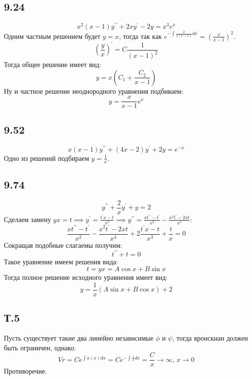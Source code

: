 \documentclass[12pt]{article}
\begin{document}
\subsection*{9.24}
\[
    x^2 (x - 1) y^{\prime\prime} + 2x y^{\prime} - 2y = x^3 e^x 
\]
Одним частным решением будет $y = x$, 
тогда так как $e^{-\int \frac{2}{x(x - 1)} dx } = (\frac{x}{x - 1})^2$. 
\[
    \left( \frac{y}{x} \right)^{\prime} = C \frac{1}{(x - 1)^2}
\] 
Тогда общее решение имеет вид: 
\[
    y = x (C_1 + \frac{C_2}{x - 1})
\]
Ну и частное решение неоднородного уравнения подбиваем: 
\[
    y = \frac{x}{x - 1} e^x
\]

\subsection*{9.52}
\[
    x(x - 1) y^{\prime\prime} + (4x - 2)y^{\prime} + 2y = e^{-x} 
\]
Одно из решений подбираем $y = \frac{1}{x}$. 


\subsection*{9.74}
\[
    y^{\prime\prime} + \frac{2}{x} y^{\prime} + y = 2
\]
Сделаем замену $yx = t \implies y^{\prime} = \frac{t^{\prime} x - t}{x^2} \implies y^{\prime\prime} = \frac{x t^{\prime\prime} - t^{\prime} }{x^2} - \frac{x^2 t^{\prime} - 2x t}{x^4}$: 
\[
    \frac{x t^{\prime\prime} - t^{\prime} }{x^2} - \frac{x^2 t^{\prime} - 2x t}{x^4} + 2\frac{t^{\prime} x - t}{x^3} + \frac{t}{x} = 0
\] 
Сокращая подобные слагаемы получим: 
\[
    t^{\prime\prime} + t = 0
\]
Такое уравнение имеем решения вида: 
\[
    t = yx = A \cos x + B \sin x
\]
Тогда полное решение исходного уравнения имеет вид: 
\[
    y = \frac{1}{x} (A \sin x + B \cos x) + 2
\]

\subsection*{Т.5}
Пусть существует такие два линейно независимые $\phi$ и $\psi$, тогда вронскиан должен быть ограничен, однако: 
\[
    Vr = C e^{\int a(x) dx} = C e^{-\int \frac{1}{x} dx} = \frac{C}{x} \to \infty, \, x \to 0
\]  
Противоречие. 
\end{document}
